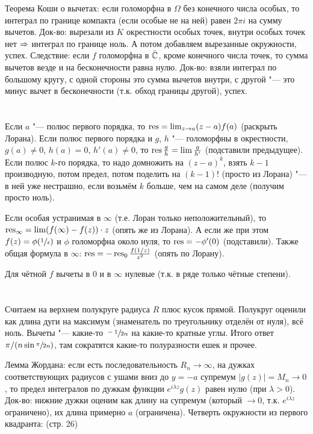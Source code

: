 	Теорема Коши о вычетах: если голоморфна в $\Omega$ без конечного числа особых, то
	интеграл по границе компакта (если особые не на ней) равен $2\pi i$ на сумму вычетов.
	Док-во: вырезали из $K$ окрестности особых точек, внутри особых точек нет $\Rightarrow$ интеграл по границе ноль.
	А потом добавляем вырезанные окружности, успех.
	Следствие: если $f$ голоморфна в $\bar {\mathbb{C}}$, кроме конечного числа точек,
	то сумма вычетов везде и на бесконечности равна нулю.
	Док-во: взяли интеграл по большому кругу, с одной стороны это сумма вычетов внутри,
	с другой "--- это минус вычет в бесконечности (т.к. обход границы другой), успех.

\section{} %
	Если $a$ "--- полюс первого порядка, то $\operatorname*{res}=\lim_{z\to a} (z-a)f(a)$ (раскрыть Лорана).
	Если полюс первого порядка и $g$, $h$ "--- голоморфны в окрестности, $g(a)\neq0$, $h(a)=0$, $h'(a)\neq 0$, то
	$\operatorname*{res} \frac{g}{h} = \lim \frac{g}{h'}$ (подставили предыдущее).
	Если полюс $k$-го порядка, то надо домножить на $(z-a)^k$, взять $k-1$ производную, потом предел, потом поделить на $(k-1)!$
	(просто из Лорана) "--- в ней уже нестрашно, если возьмём $k$ больше, чем на самом деле (получим просто ноль).

	Если особая устранимая в $\infty$ (т.е. Лоран только неположительный),
	то $\operatorname*{res}_{\infty} = \lim (f(\infty) - f(z))\cdot z$ (опять же из Лорана).
	А если же при этом $f(z)=\phi(\sfrac 1z)$ и $\phi$ голоморфна около нуля, то $\operatorname*{res}=-\phi'(0)$
	(подставили).
	Также общая формула в $\infty$: $\operatorname*{res} = -\operatorname*{res}_0 \frac{f(1/z)}{z^2}$ (опять по Лорану).

	Для чётной $f$ вычеты в $0$ и в $\infty$ нулевые (т.к. в ряде только чётные степени).

\section{} %
	Считаем на верхнем полукруге радиуса $R$ плюс кусок прямой.
	Полукруг оценили как длина дуги на максимум (знаменатель по треугольнику отделён от нуля), всё ноль.
	Вычеты "--- какие-то $\sfrac{-1}{2n}$ на какие-то кратные углы.
	Итого ответ $\pi/(n\sin \sfrac{\pi}{2n})$, там сократятся какие-то полуразности ешек и прочее.

	Лемма Жордана: если есть последовательность $R_n \to \infty$,
	на дужках соответствующих радиусов с ушами вниз до $y=-a$ супремум $|g(z)|=M_n \to 0$,
	то предел интегралов по дужкам функции $e^{i\lambda z} g(z)$ равен нулю (при $\lambda >0$).
	Док-во: нижние дужки оценим как длину на супремум (который $\to 0$, т.к. $e^{i\lambda z}$ ограничено),
	их длина примерно $a$ (ограничена).
	Четверть окружности из первого квадранта: (стр. 26) \TODO

